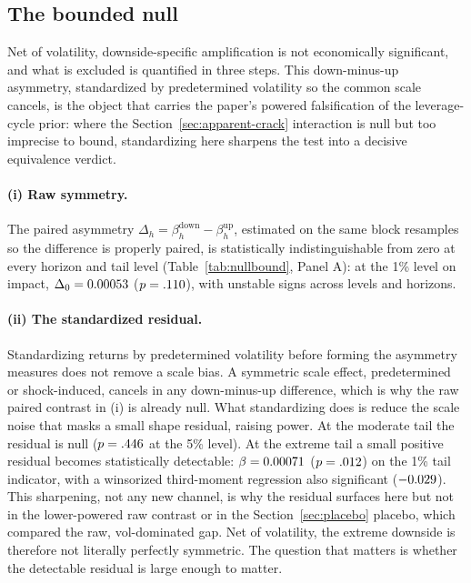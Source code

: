 \subsection{The bounded null}
\label{sec:boundednull}

Net of volatility, downside-specific
amplification is not economically significant, and what is excluded is
quantified in three steps. This down-minus-up asymmetry, standardized by
predetermined volatility so the common scale cancels, is the object that
carries the paper's powered falsification of the leverage-cycle prior: where
the Section~\ref{sec:apparent-crack} interaction is null but too imprecise to
bound, standardizing here sharpens the test into a decisive equivalence
verdict.

\paragraph{(i) Raw symmetry.}
The paired asymmetry $\Delta_h = \beta^{\text{down}}_h -
\beta^{\text{up}}_h$, estimated on the same block resamples so the
difference is properly paired, is statistically indistinguishable from
zero at every horizon and tail level (Table~\ref{tab:nullbound}, Panel A):
at the 1\% level on impact, $\Delta_0 = 0.00053$
($p = .110$), with unstable signs across levels and horizons.

\paragraph{(ii) The standardized residual.}
Standardizing returns by predetermined volatility before forming the
asymmetry measures does not remove a scale bias. A symmetric scale
effect, predetermined or shock-induced, cancels in any down-minus-up
difference, which is why the raw paired contrast in (i) is already null.
What standardizing does is reduce the scale noise that masks a small shape
residual, raising power. At the moderate tail the residual is null
($p = .446$ at the 5\% level). At the extreme tail a small
positive residual becomes statistically detectable: $\beta = 0.00071$ ($p = .012$) on the 1\% tail
indicator, with a winsorized third-moment regression also significant
($-0.029$). This sharpening, not any new channel, is why the
residual surfaces here but not in the lower-powered raw contrast or in the
Section~\ref{sec:placebo} placebo, which compared the raw, vol-dominated
gap. Net of volatility, the extreme downside is therefore not
literally perfectly symmetric. The question that matters is whether
the detectable residual is large enough to matter.

